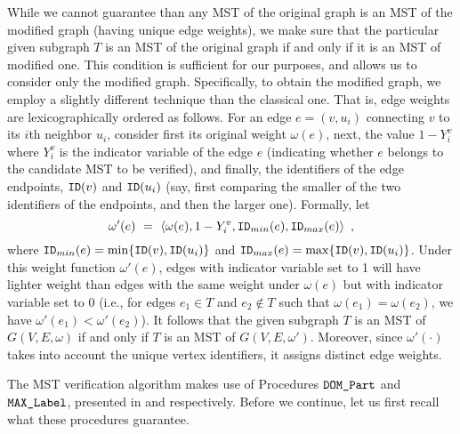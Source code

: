 \documentclass[11pt,letter]{article}
\def\DOM{\mbox{\tt DOM\_Part}}
\def\LAB{\mbox{\tt MAX\_Label}}
\def\ID{\mbox{\tt ID}}
\begin{document}
While we cannot guarantee than any MST of the original graph is an MST of 
the modified graph (having unique edge weights), we make sure that 
the particular given subgraph $T$ is an MST of the original graph 
if and only if it is an MST of modified one. This condition is sufficient for our purposes, and allows us to consider only the modified graph.
Specifically, to obtain the modified graph, we employ a slightly different 
technique than the classical one. 
That is, edge weights are lexicographically ordered as follows.
For an edge $e=(v,u_i)$ connecting $v$ to its $i$th neighbor $u_i$, 
consider first its original weight $\omega(e)$, 
next, the value $1-Y_i^v$ where $Y_i^v$ is the indicator variable of the edge
$e$ (indicating whether $e$ belongs to the candidate MST to be verified), 
and finally, the identifiers of the edge endpoints, $\ID(v)$ and $\ID(u_i)$
(say, first comparing the smaller of the two identifiers of the endpoints, 
and then the larger one). 
Formally, let 
$$\omega'(e) ~=~ 
\left\langle \omega(e), 1-Y_i^v, \ID_{min}(e), \ID_{max}(e) \right\rangle~,$$
where $\ID_{min}(e) = \min\{\ID(v),\ID(u_i)\}$
and $\ID_{max}(e) = \max\{\ID(v),\ID(u_i)\}$.
Under this weight function $\omega'(e)$, edges with indicator variable set to 1
will have lighter weight than edges with the same weight under $\omega(e)$ 
but with indicator variable set to 0 
(i.e., for edges $e_1\in T$ and $e_2\notin T$ such that 
$\omega(e_1)=\omega(e_2)$, we have $\omega'(e_1)< \omega'(e_2)$).
It follows that  the given subgraph $T$ 
 is an MST of $G(V,E,\omega)$ if and only if  $T$ is an MST
of $G(V,E,\omega')$. Moreover, since $\omega'(\cdot)$ takes into account  
the unique vertex identifiers, it assigns distinct edge weights.

The MST verification algorithm makes use of Procedures $\DOM$ and $\LAB$, 
presented in \cite{KP_98} and \cite{KKKP_05} respectively. Before we continue, let us first recall what these procedures guarantee. 
\end{document}
